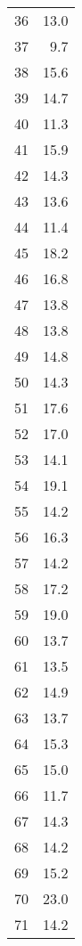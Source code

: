 \begin{multicols}{4}
\begin{table}[H]
\begin{tabular}{|c|r|}
            \hline
        \end{tabular}
    \end{table}
    \columnbreak
    \begin{table}[H]
        \centering
        \begin{tabular}{|c|r|}
            \hline
            36 & 13.0 \\
            37 & 9.7 \\
            38 & 15.6 \\
            39 & 14.7 \\
            40 & 11.3 \\
            41 & 15.9 \\
            42 & 14.3 \\
            43 & 13.6 \\
            44 & 11.4 \\
            45 & 18.2 \\
            46 & 16.8 \\
            47 & 13.8 \\
            48 & 13.8 \\
            49 & 14.8 \\
            50 & 14.3 \\
            51 & 17.6 \\
            52 & 17.0 \\
            53 & 14.1 \\
            54 & 19.1 \\
            55 & 14.2 \\
            56 & 16.3 \\
            57 & 14.2 \\
            58 & 17.2 \\
            59 & 19.0 \\
            60 & 13.7 \\
            61 & 13.5 \\
            62 & 14.9 \\
            63 & 13.7 \\
            64 & 15.3 \\
            65 & 15.0 \\
            66 & 11.7 \\
            67 & 14.3 \\
            68 & 14.2 \\
            69 & 15.2 \\
            70 & 23.0 \\
            71 & 14.2 \\

\end{tabular}
\end{table}
\end{multicols}
